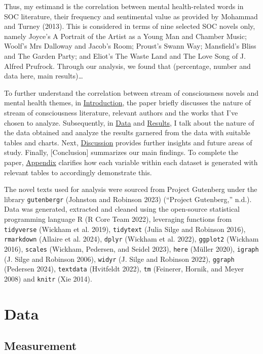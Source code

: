 \documentclass[
  letterpaper,
  DIV=11,
  numbers=noendperiod]{scrartcl}
\begin{document}
Thus, my estimand is the correlation between mental health-related words
in SOC literature, their frequency and sentimental value as provided by
Mohammad and Turney (2013). This is considered in terms of nine selected
SOC novels only, namely Joyce's A Portrait of the Artist as a Young Man
and Chamber Music; Woolf's Mrs Dalloway and Jacob's Room; Proust's Swann
Way; Mansfield's Bliss and The Garden Party; and Eliot's The Waste Land
and The Love Song of J. Alfred Prufrock. Through our analysis, we found
that (percentage, number and data here, main results)\ldots{}

To further understand the correlation between stream of consciousness
novels and mental health themes, in
\hyperref[introduction]{Introduction}, the paper briefly discusses the
nature of stream of consciousness literature, relevant authors and the
works that I've chosen to analyze. Subsequently, in
\hyperref[sec-data]{Data} and \hyperref[results]{Results}, I talk about
the nature of the data obtained and analyze the results garnered from
the data with suitable tables and charts. Next,
\hyperref[discussion]{Discussion} provides further insights and future
areas of study. Finally, {[}Conclusion{]} summarizes our main findings.
To complete the paper, \hyperref[appendix]{Appendix} clarifies how each
variable within each dataset is generated with relevant tables to
accordingly demonstrate this.

The novel texts used for analysis were sourced from Project Gutenberg
under the library \texttt{gutenbergr} (Johnston and Robinson 2023)
({``Project Gutenberg,''} n.d.). Data was generated, extracted and
cleaned using the open-source statistical programming language R (R Core
Team 2022), leveraging functions from \texttt{tidyverse} (Wickham et al.
2019), \texttt{tidytext} (Julia Silge and Robinson 2016),
\texttt{rmarkdown} (Allaire et al. 2024), \texttt{dplyr} (Wickham et al.
2022), \texttt{ggplot2} (Wickham 2016), \texttt{scales} (Wickham,
Pedersen, and Seidel 2023), \texttt{here} (Müller 2020), \texttt{igraph}
(J. Silge and Robinson 2006), \texttt{widyr} (J. Silge and Robinson
2022), \texttt{ggraph} (Pedersen 2024), \texttt{textdata} (Hvitfeldt
2022), \texttt{tm} (Feinerer, Hornik, and Meyer 2008) and \texttt{knitr}
(Xie 2014).

\section{Data}\label{sec-data}

\subsection{Measurement}\label{measurement}
\end{document}
